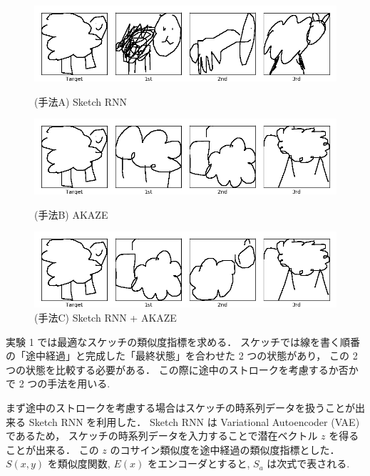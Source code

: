 \documentclass[twocolumn]{jarticle}     %
\begin{document}
\begin{figure}[tb]
 \begin{minipage}{1\hsize}
 	\begin{center}
 		\includegraphics[clip,width=115mm]{sketch_trained_sim_A_0.png}
 		\caption{(手法A) Sketch RNN}
 		\label{fig:exp1_a}
 	\end{center}
 \end{minipage}

  \begin{minipage}{1\hsize}
  	\begin{center}
  		\includegraphics[clip,width=115mm]{sketch_trained_sim_B_0.png}
  		\caption{(手法B) AKAZE}
  		\label{fig:exp1_b}
  	\end{center}
  \end{minipage}

   \begin{minipage}{1\hsize}
   	\begin{center}
   		\includegraphics[clip,width=115mm]{sketch_trained_sim_D_0.png}
   		\caption{(手法C) Sketch RNN + AKAZE}
   		\label{fig:exp1_c}
   	\end{center}
   \end{minipage}
\end{figure}

実験 1 では最適なスケッチの類似度指標を求める．
スケッチでは線を書く順番の「途中経過」と完成した「最終状態」を合わせた 2 つの状態があり，
この 2 つの状態を比較する必要がある．
この際に途中のストロークを考慮するか否かで 2 つの手法を用いる.

まず途中のストロークを考慮する場合はスケッチの時系列データを扱うことが出来る Sketch RNN を利用した．
Sketch RNN は Variational Autoencoder (VAE) であるため，
スケッチの時系列データを入力することで潜在ベクトル $z$ を得ることが出来る．
この $z$ のコサイン類似度を途中経過の類似度指標とした．
$S(x, y)$ を類似度関数, $E(x)$ をエンコーダとすると, $S_a$ は次式で表される.
\end{document}
